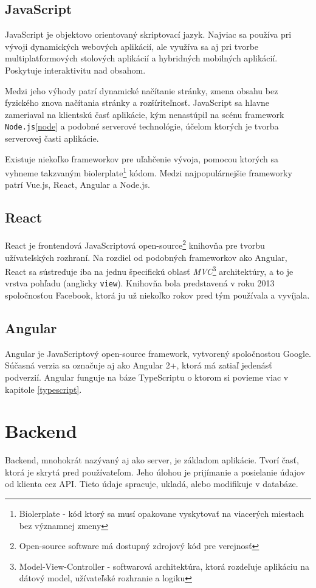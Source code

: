 \subsection{JavaScript}
JavaScript je objektovo orientovaný skriptovací jazyk. Najviac sa používa pri vývoji dynamických webových aplikácií, ale využíva sa aj pri tvorbe multiplatformových stolových aplikácií a hybridných mobilných aplikácií. Poskytuje interaktivitu nad obsahom. 

Medzi jeho výhody patrí dynamické načítanie stránky, zmena obsahu bez fyzického znova načítania stránky a rozšíriteľnosť. JavaScript sa hlavne zameriaval na klientskú časť aplikácie, kým nenastúpil na scénu framework \texttt{Node.js}\ref{node} a podobné serverové technológie, účelom ktorých je tvorba serverovej časti aplikácie.

Existuje niekoľko frameworkov pre uľahčenie vývoja, pomocou ktorých sa vyhneme takzvaným biolerplate\footnote{Biolerplate - kód ktorý sa musí opakovane vyskytovať na viacerých miestach bez významnej zmeny} kódom. Medzi najpopulárnejšie frameworky patrí Vue.js, React, Angular a Node.js.

\subsection{React}
React je frontendová JavaScriptová open-source\footnote{Open-source software má dostupný zdrojový kód pre verejnosť} knihovňa pre tvorbu užívateľských rozhraní. Na rozdiel od podobných frameworkov ako Angular, React sa sústreďuje iba na jednu špecifickú oblasť \textit{MVC}\footnote{Model-View-Controller - softwarová architektúra, ktorá rozdeľuje aplikáciu na dátový model, užívateľské rozhranie a logiku} architektúry, a to je vrstva pohľadu (anglicky \texttt{view}). Knihovňa bola predstavená v roku 2013 spoločnosťou Facebook, ktorá ju už niekoľko rokov pred tým používala a vyvíjala. 

\subsection{Angular}
Angular je JavaScriptový open-source framework, vytvorený spoločnostou Google. Súčasná verzia sa označuje aj ako Angular 2+, ktorá má zatiaľ jedenásť podverzií. Angular funguje na báze TypeScriptu o ktorom si povieme viac v kapitole \ref{typescript}.

\section{Backend}
Backend, mnohokrát nazývaný aj ako server, je základom aplikácie. Tvorí časť, ktorá je skrytá pred používateľom. Jeho úlohou je prijímanie a posielanie údajov od klienta cez API. Tieto údaje spracuje, ukladá, alebo modifikuje v databáze. 

